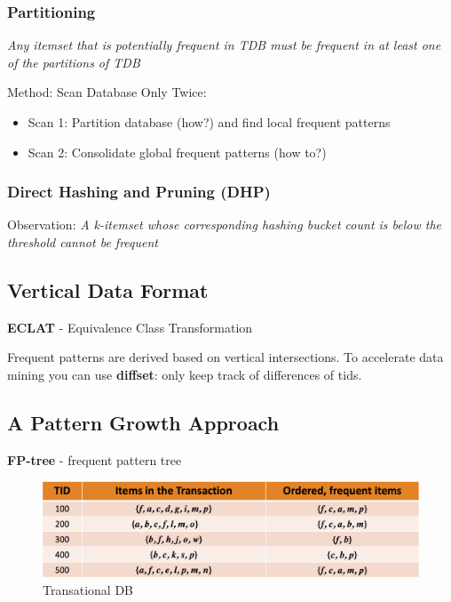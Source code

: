 \subsubsection{Partitioning}
\begin{theorem}
\textit{Any itemset that is potentially frequent in TDB must be frequent in at least one of the partitions of TDB}
\end{theorem}

Method: Scan Database Only Twice:
\begin{itemize}
\item Scan 1: Partition database (how?) and find local frequent patterns
\item Scan 2: Consolidate global frequent patterns (how to?)
\end{itemize}

\subsubsection{Direct Hashing and Pruning (DHP)}
Observation: \textit{A k-itemset whose corresponding hashing bucket count is below the threshold cannot be frequent}

\subsection{Vertical Data Format}\label{eclat}
\textbf{ECLAT} - Equivalence Class Transformation

Frequent patterns are derived based on vertical intersections. To accelerate data mining you can use \textbf{diffset}: only keep track of differences of tids.

\subsection{A Pattern Growth Approach}\label{fpgrowth}
\textbf{FP-tree} - frequent pattern tree

\begin{figure}[H]
    \centering
    \includegraphics[width=\linewidth]{transactional_db.png}
    \caption{Transational DB}
\end{figure}

